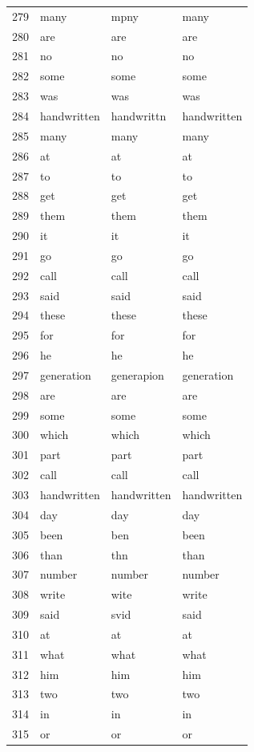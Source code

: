 \begin{longtable}{clll}
    279 & many & mpny & many \\
    280 & are & are & are \\
    281 & no & no & no \\
    282 & some & some & some \\
    283 & was & was & was \\
    284 & handwritten & handwrittn & handwritten \\
    285 & many & many & many \\
    286 & at & at & at \\
    287 & to & to & to \\
    288 & get & get & get \\
    289 & them & them & them \\
    290 & it & it & it \\
    291 & go & go & go \\
    292 & call & call & call \\
    293 & said & said & said \\
    294 & these & these & these \\
    295 & for & for & for \\
    296 & he & he & he \\
    297 & generation & generapion & generation \\
    298 & are & are & are \\
    299 & some & some & some \\
    300 & which & which & which \\
    301 & part & part & part \\
    302 & call & call & call \\
    303 & handwritten & handwritten & handwritten \\
    304 & day & day & day \\
    305 & been & ben & been \\
    306 & than & thn & than \\
    307 & number & number & number \\
    308 & write & wite & write \\
    309 & said & svid & said \\
    310 & at & at & at \\
    311 & what & what & what \\
    312 & him & him & him \\
    313 & two & two & two \\
    314 & in & in & in \\
    315 & or & or & or \\

\end{longtable}
